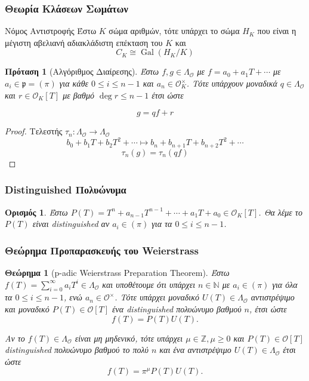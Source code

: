 \documentclass{beamer}
\newcommand {\tl}{\textlatin}
\newcommand{\Gal}{\operatorname{Gal}}
\newcommand{\Q}{\mathbb{Q}}
\newcommand{\Z}{\mathbb{Z}}
\newcommand{\Lo}{\Lambda_{\mathcal{O}}}
\newtheorem{thrm}{Θεώρημα}
\newtheorem*{defn}{Ορισμός}
\newtheorem{prop}{Πρόταση}
\begin{document}
\begin{frame}
\frametitle{Θεωρία Κλάσεων Σωμάτων}

\begin{block}{Νόμος Αντιστροφής}
Έστω $K$ σώμα αριθμών, τότε υπάρχει το σώμα $H_K$ που είναι η μέγιστη αβελιανή αδιακλάδιστη επέκταση του $K$ και 
$$C_K \cong \Gal(H_K/K)$$

 

\end{block}

\end{frame}

\begin{frame}

\begin{prop}[Αλγόριθμος Διαίρεσης]
	Έστω $f,g \in \Lambda_{\mathcal{O}}$ με $f = a_0 + a_1 T + \cdots$ με $a_i \in \mathfrak{p} = (\pi)$ για κάθε $0\leq i \leq n-1$ και $a_n \in \mathcal{O}_K^\times$. Τότε υπάρχουν μοναδικά $q \in \Lo$ και $r \in \mathcal{O}_K [T]$ με βαθμό $\deg r\leq n-1$ έτσι ώστε

	$$g = qf + r$$
\end{prop}
\pause 
\begin{proof}
Τελεστής $\tau_n : \Lo \longrightarrow \Lo$
	$$b_0 + b_1 T + b_2 T^2 + \cdots \longmapsto b_n + b_{n+1}T + b_{n+2}T^2 + \cdots$$
    $$\tau_n(g) = \tau_n(qf)$$
\end{proof}

\end{frame}

\begin{frame}

\frametitle{\tl{Distinguished} Πολυώνυμα}
\begin{defn} Έστω $P(T) = T^n + a_{n-1}T^{n-1} + \cdots + a_1 T + a_0 \in \mathcal{O}_K[T]$. Θα λέμε το $P(T)$ είναι \tl{distinguished} αν $a_i \in (\pi)$ για τα $0\leq i \leq n-1$.
\end{defn}
\end{frame}

\begin{frame}
\frametitle{Θεώρημα Προπαρασκευής του \tl{Weierstrass}}

\begin{thrm}[\tl{p-adic Weierstrass Preparation Theorem}]
	Έστω $f(T) = \sum\limits_{i=0}^\infty a_i T^i \in \Lo$ και υποθέτουμε ότι υπάρχει $n \in \mathbb{N}$ με $a_i\in (\pi)$ για όλα τα $0\leq i \leq n-1$, ενώ $a_n \in \mathcal{O}^\times$. Τότε υπάρχει μοναδικό $U(T) \in \Lo$ αντιστρέψιμο και μοναδικό $P(T) \in \mathcal{O}[T]$ ένα \tl{distinguished} πολυώνυμο βαθμού $n$, έτσι ώστε
	$$f(T) = P(T)U(T).$$

	\noindent Αν το $f(T) \in \Lo$ είναι μη μηδενικό, τότε υπάρχει $\mu \in \Z, \mu \geq 0$ και $P(T) \in \mathcal{O}[T]$ \tl{distinguished} πολυώνυμο βαθμού 
	το πολύ $n$ και ένα αντιστρέψιμο $U(T)\in \Lo$ έτσι ώστε
	$$f(T) = \pi^{\mu} P(T) U(T).$$
\end{thrm}

\end{frame}
\end{document}
